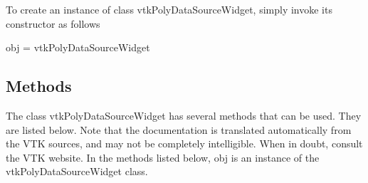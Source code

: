 To create an instance of class vtk\-Poly\-Data\-Source\-Widget, simply invoke its constructor as follows \begin{DoxyVerb}  obj = vtkPolyDataSourceWidget
\end{DoxyVerb}
 \hypertarget{vtkwidgets_vtkxyplotwidget_Methods}{}\subsection{Methods}\label{vtkwidgets_vtkxyplotwidget_Methods}
The class vtk\-Poly\-Data\-Source\-Widget has several methods that can be used. They are listed below. Note that the documentation is translated automatically from the V\-T\-K sources, and may not be completely intelligible. When in doubt, consult the V\-T\-K website. In the methods listed below, {\ttfamily obj} is an instance of the vtk\-Poly\-Data\-Source\-Widget class. 
